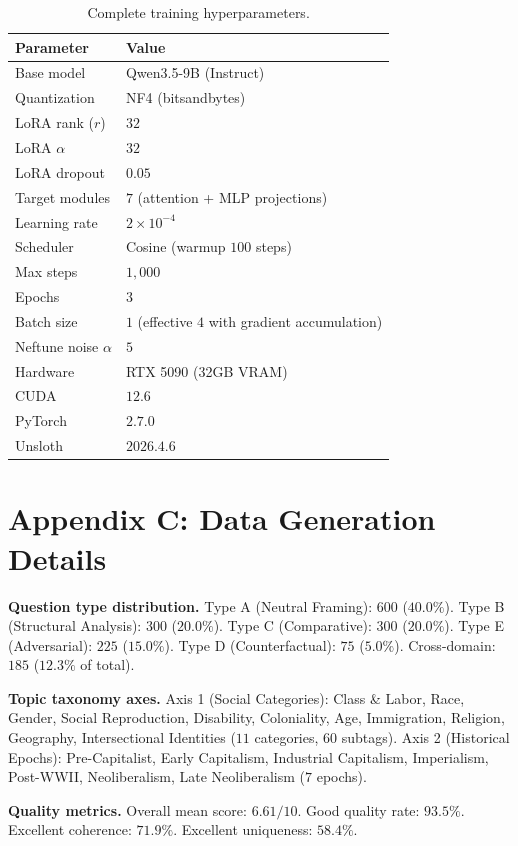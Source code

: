 \documentclass[11pt]{article}
\begin{document}
\begin{table}
\caption{Complete training hyperparameters.}
\label{tab:training_config}
\begin{tabular}{ll}
\toprule
Parameter & Value \\
\midrule
Base model & Qwen3.5-9B (Instruct) \\
Quantization & NF4 (bitsandbytes) \\
LoRA rank ($r$) & $32$ \\
LoRA $\alpha$ & $32$ \\
LoRA dropout & $0.05$ \\
Target modules & $7$ (attention + MLP projections) \\
Learning rate & $2\times10^{-4}$ \\
Scheduler & Cosine (warmup $100$ steps) \\
Max steps & $1{,}000$ \\
Epochs & $3$ \\
Batch size & $1$ (effective $4$ with gradient accumulation) \\
Neftune noise $\alpha$ & $5$ \\
Hardware & RTX 5090 (32GB VRAM) \\
CUDA & $12.6$ \\
PyTorch & $2.7.0$ \\
Unsloth & $2026.4.6$ \\
\bottomrule
\end{tabular}
\end{table}

\section{Appendix C: Data Generation Details}

\textbf{Question type distribution.} Type A (Neutral Framing): $600$ ($40.0\%$). Type B (Structural Analysis): $300$ ($20.0\%$). Type C (Comparative): $300$ ($20.0\%$). Type E (Adversarial): $225$ ($15.0\%$). Type D (Counterfactual): $75$ ($5.0\%$). Cross-domain: $185$ ($12.3\%$ of total).

\textbf{Topic taxonomy axes.} Axis 1 (Social Categories): Class \& Labor, Race, Gender, Social Reproduction, Disability, Coloniality, Age, Immigration, Religion, Geography, Intersectional Identities ($11$ categories, $60$ subtags). Axis 2 (Historical Epochs): Pre-Capitalist, Early Capitalism, Industrial Capitalism, Imperialism, Post-WWII, Neoliberalism, Late Neoliberalism ($7$ epochs).

\textbf{Quality metrics.} Overall mean score: $6.61/10$. Good quality rate: $93.5\%$. Excellent coherence: $71.9\%$. Excellent uniqueness: $58.4\%$.
\end{document}
